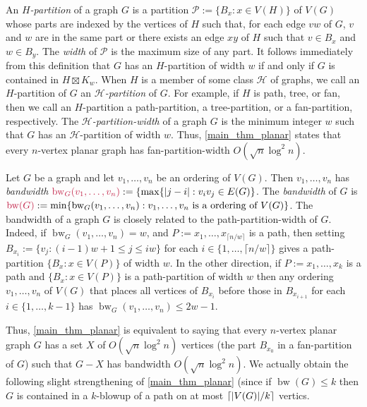 \documentclass{patmorin}
\makeatletter
\renewcommand{\le}{\leqslant}
\renewcommand{\leq}{\leqslant}
\newcommand{\david}[1]{{\color{orange} David: #1}}
\newcommand{\defin}[1]{\emph{\textcolor{brightmaroon}{#1}}}
\def\mathcolor#1#{\@mathcolor{#1}}
\def\@mathcolor#1#2#3{%
  \protect\leavevmode
  \begingroup
    \color#1{#2}#3%
  \endgroup
}
\newcommand{\mathdefin}[1]{\mathcolor{brightmaroon}{#1}}
\DeclareMathOperator{\bw}{bw}
\makeatother
\begin{document}
An \defin{$H$-partition} of a graph $G$ is a partition $\mathcal{P}:=\{B_x: x\in V(H)\}$ of $V(G)$ whose parts are indexed by the vertices of $H$ such that, for each edge $vw$ of $G$, $v$ and $w$ are in the same part or there exists an edge $xy$ of $H$ such that $v\in B_x$ and $w\in B_y$.  The \defin{width} of $\mathcal{P}$ is the maximum size of any part.  It follows immediately from this definition that $G$ has an $H$-partition of width $w$ if and only if $G$ is contained in $H\boxtimes K_w$. When $H$ is a member of some class $\mathcal{H}$ of graphs, we call an $H$-partition of $G$ an \defin{$\mathcal{H}$-partition} of $G$.  For example, if $H$ is path, tree, or fan, then we call an $H$-partition a path-partition, a tree-partition, or a fan-partition, respectively.  The \defin{$\mathcal{H}$-partition-width}  of a graph $G$ is the minimum integer $w$ such that $G$ has an $\mathcal{H}$-partition of width $w$. Thus, \cref{main_thm_planar} states that every $n$-vertex planar graph has fan-partition-width $O(\sqrt{n}\log^2 n)$.


Let $G$ be a graph and let $v_1,\ldots,v_n$ be an ordering of $V(G)$.  Then $v_1,\ldots,v_n$ has \defin{bandwidth} $\mathdefin{\bw_G(v_1,\ldots,v_n)}:=\{\max\{|j-i|: v_iv_j\in E(G)\}$.  The \defin{bandwidth} of $G$ is $\mathdefin{\bw(G)}:=\min\{\bw_G(v_1,\ldots,v_n):\text{$v_1,\ldots,v_n$ is a ordering of $V(G)$}\}$. The bandwidth of a graph $G$ is closely related to the path-partition-width of $G$.  Indeed, if $\bw_G(v_1,\ldots,v_n)=w$, and $P:=x_1,\ldots,x_{\lceil n/w\rceil}$ is a path, then setting $B_{x_i}:=\{v_j: (i-1)w+1 \le j \le iw\}$ for each $i\in\{1,\ldots,\lceil n/w\rceil\}$ gives a path-partition $\{B_{x}:x\in V(P)\}$ of width $w$.  In the other direction, if $P:=x_1,\ldots,x_k$ is a path and  $\{B_x:x\in V(P)\}$ is a path-partition of width $w$ then any ordering $v_1,\ldots,v_n$ of $V(G)$ that places all vertices of $B_{x_i}$ before those in $B_{x_{i+1}}$ for each $i\in\{1,\ldots,k-1\}$ has $\bw_G(v_1,\ldots,v_n)\le 2w-1$.  

Thus, \cref{main_thm_planar} is equivalent to saying that every $n$-vertex planar graph $G$ has a set $X$ of  $O(\sqrt{n}\log^2 n)$ vertices (the part $B_{x_0}$ in a fan-partition of $G$) such that $G-X$ has bandwidth $O(\sqrt{n}\log^2 n)$. We actually obtain the following slight strengthening of \cref{main_thm_planar} (since if $\bw(G)\leq k$ then $G$ is contained in a $k$-blowup of a path on at most ${\lceil |V(G)|/k \rceil}$ vertics. 
\end{document}
